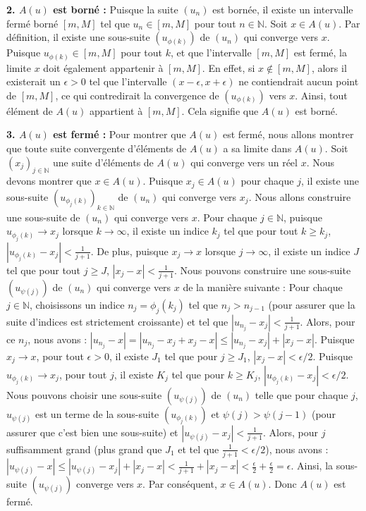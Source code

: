 \documentclass{report}
\begin{document}
\textbf{2. $A(u)$ est borné :}
Puisque la suite $(u_n)$ est bornée, il existe un intervalle fermé borné $[m, M]$ tel que $u_n \in [m, M]$ pour tout $n \in \mathbb{N}$.
Soit $x \in A(u)$. Par définition, il existe une sous-suite $(u_{\phi(k)})$ de $(u_n)$ qui converge vers $x$. Puisque $u_{\phi(k)} \in [m, M]$ pour tout $k$, et que l'intervalle $[m, M]$ est fermé, la limite $x$ doit également appartenir à $[m, M]$. En effet, si $x \notin [m, M]$, alors il existerait un $\epsilon > 0$ tel que l'intervalle $(x-\epsilon, x+\epsilon)$ ne contiendrait aucun point de $[m, M]$, ce qui contredirait la convergence de $(u_{\phi(k)})$ vers $x$.
Ainsi, tout élément de $A(u)$ appartient à $[m, M]$. Cela signifie que $A(u)$ est borné.

\textbf{3. $A(u)$ est fermé :}
Pour montrer que $A(u)$ est fermé, nous allons montrer que toute suite convergente d'éléments de $A(u)$ a sa limite dans $A(u)$.
Soit $(x_j)_{j \in \mathbb{N}}$ une suite d'éléments de $A(u)$ qui converge vers un réel $x$. Nous devons montrer que $x \in A(u)$.
Puisque $x_j \in A(u)$ pour chaque $j$, il existe une sous-suite $(u_{\phi_j(k)})_{k \in \mathbb{N}}$ de $(u_n)$ qui converge vers $x_j$.
Nous allons construire une sous-suite de $(u_n)$ qui converge vers $x$.
Pour chaque $j \in \mathbb{N}$, puisque $u_{\phi_j(k)} \to x_j$ lorsque $k \to \infty$, il existe un indice $k_j$ tel que pour tout $k \ge k_j$, $|u_{\phi_j(k)} - x_j| < \frac{1}{j+1}$.
De plus, puisque $x_j \to x$ lorsque $j \to \infty$, il existe un indice $J$ tel que pour tout $j \ge J$, $|x_j - x| < \frac{1}{j+1}$.
Nous pouvons construire une sous-suite $(u_{\psi(j)})$ de $(u_n)$ qui converge vers $x$ de la manière suivante :
Pour chaque $j \in \mathbb{N}$, choisissons un indice $n_j = \phi_j(k_j)$ tel que $n_j > n_{j-1}$ (pour assurer que la suite d'indices est strictement croissante) et tel que $|u_{n_j} - x_j| < \frac{1}{j+1}$.
Alors, pour ce $n_j$, nous avons :
$|u_{n_j} - x| = |u_{n_j} - x_j + x_j - x| \le |u_{n_j} - x_j| + |x_j - x|$.
Puisque $x_j \to x$, pour tout $\epsilon > 0$, il existe $J_1$ tel que pour $j \ge J_1$, $|x_j - x| < \epsilon/2$.
Puisque $u_{\phi_j(k)} \to x_j$, pour tout $j$, il existe $K_j$ tel que pour $k \ge K_j$, $|u_{\phi_j(k)} - x_j| < \epsilon/2$.
Nous pouvons choisir une sous-suite $(u_{\psi(j)})$ de $(u_n)$ telle que pour chaque $j$, $u_{\psi(j)}$ est un terme de la sous-suite $(u_{\phi_j(k)})$ et $\psi(j) > \psi(j-1)$ (pour assurer que c'est bien une sous-suite) et $|u_{\psi(j)} - x_j| < \frac{1}{j+1}$.
Alors, pour $j$ suffisamment grand (plus grand que $J_1$ et tel que $\frac{1}{j+1} < \epsilon/2$), nous avons :
$|u_{\psi(j)} - x| \le |u_{\psi(j)} - x_j| + |x_j - x| < \frac{1}{j+1} + |x_j - x| < \frac{\epsilon}{2} + \frac{\epsilon}{2} = \epsilon$.
Ainsi, la sous-suite $(u_{\psi(j)})$ converge vers $x$. Par conséquent, $x \in A(u)$.
Donc $A(u)$ est fermé.
\end{document}
